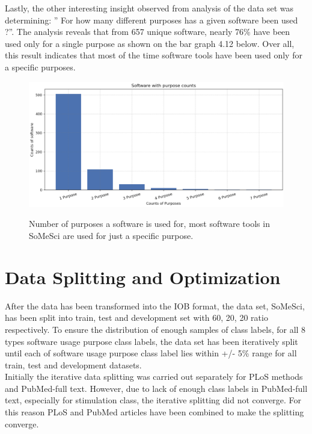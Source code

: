 Lastly, the other interesting insight observed from analysis of the data set was determining: ” For how many different purposes has a given software been used ?”.  The analysis reveals that from 657 unique software, nearly 76\% have been used only for a single purpose as shown on the bar graph 4.12 below. Over all, this result indicates that most of the time software tools have been used only for a specific purposes.


\begin{figure}[h]
	\centering
	\includegraphics[width=.80\linewidth]{4.graphics/figures/ch_4/analysisresults/7.counts of software purpose}
	\label{fig:chapter03:subfloat:grafik1}
	\caption{Number of purposes a software is used for, most software tools in SoMeSci are used for just a specific purpose.}
\end{figure}



\section{Data Splitting and Optimization}
\label{subsec:dataset:preprocessing:Splitting}
After the data has been transformed into the IOB format, the data set, \ac{SoMeSci}, has been split into train, test and development set with  60, 20, 20 ratio respectively. To ensure the distribution  of enough samples of class labels, for all 8 types software usage purpose class labels, the data set has been iteratively split until each of software usage purpose class label lies within +/- 5\%  range for all train, test and development datasets. \\ 

Initially the iterative data splitting was carried out separately for PLoS methods and PubMed-full text. However, due to lack of enough class labels in PubMed-full text, especially for stimulation class, the iterative splitting did not converge. For this reason PLoS and PubMed articles have been combined to make the splitting converge. \\

